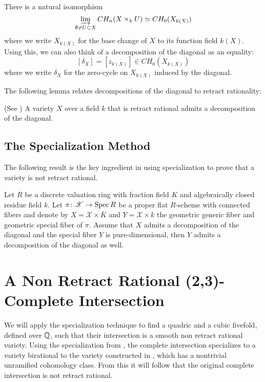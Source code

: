 There is a natural isomorphism
\[\varinjlim_{\emptyset \neq U \subset X} CH_n(X \times_k U) \simeq CH_0(X_{k(X)})\]
where we write $X_{k(X)}$ for the base change of $X$ to its function field $k(X)$. Using this, we can also think of a decomposition of the diagonal as an equality:
\[[\delta_X] = [z_{k(X)}] \in CH_0(X_{k(X)})\]
where we write $\delta_X$ for the zero-cycle on $X_{k(X)}$ induced by the diagonal.

The following lemma relates decompositions of the diagonal to retract rationality:
\begin{lemma}{{\textrm{(See \eg \cite[Lemma 2.4]{SchreiederHypersurface})}}}
	A variety $X$ over a field $k$ that is retract rational admits a decomposition of the diagonal.
\end{lemma}

\subsection{The Specialization Method}
The following result is the key ingredient in using specialization to prove that a variety is not retract rational.

\begin{proposition}{{\cite[Corollary 8.3]{SchreiederCyclesAndRationality}}}
  \label{prop:ZSpecialization}
  Let $R$ be a discrete valuation ring with fraction field $K$ and algebraically closed residue field $k$. Let $\pi \colon \mathscr{X} \to \operatorname{Spec} R$ be a proper flat $R$-scheme with connected fibers and denote by $X = \mathscr{X} \times \overline{K}$ and $Y = \mathscr{X} \times k$ the geometric generic fiber and geometric special fiber of $\pi$. Assume that $X$ admits a decomposition of the diagonal and the special fiber $Y$ is pure-dimensional, then $Y$ admits a decomposition of the diagonal as well.
\end{proposition}

\section{A Non Retract Rational (2,3)-Complete Intersection}
\label{sec:Example}
We will apply the specialization technique to find a quadric and a cubic fivefold, defined over $\mathbb{Q}$, such that their intersection is a smooth non retract rational variety. Using the specialization from \cite{NicaiseOttem}, the complete intersection specializes to a variety birational to the variety constructed in \cite{HPTActa}, which has a nontrivial unramified cohomology class. From this it will follow that the original complete intersection is not retract rational.

